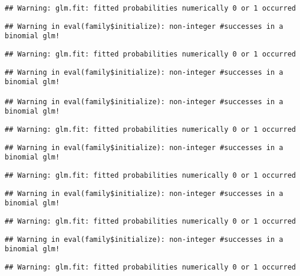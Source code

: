 \documentclass[
]{article}
\begin{document}
\begin{verbatim}
## Warning: glm.fit: fitted probabilities numerically 0 or 1 occurred
\end{verbatim}

\begin{verbatim}
## Warning in eval(family$initialize): non-integer #successes in a binomial glm!
\end{verbatim}

\begin{verbatim}
## Warning: glm.fit: fitted probabilities numerically 0 or 1 occurred
\end{verbatim}

\begin{verbatim}
## Warning in eval(family$initialize): non-integer #successes in a binomial glm!

## Warning in eval(family$initialize): non-integer #successes in a binomial glm!
\end{verbatim}

\begin{verbatim}
## Warning: glm.fit: fitted probabilities numerically 0 or 1 occurred
\end{verbatim}

\begin{verbatim}
## Warning in eval(family$initialize): non-integer #successes in a binomial glm!
\end{verbatim}

\begin{verbatim}
## Warning: glm.fit: fitted probabilities numerically 0 or 1 occurred
\end{verbatim}

\begin{verbatim}
## Warning in eval(family$initialize): non-integer #successes in a binomial glm!
\end{verbatim}

\begin{verbatim}
## Warning: glm.fit: fitted probabilities numerically 0 or 1 occurred
\end{verbatim}

\begin{verbatim}
## Warning in eval(family$initialize): non-integer #successes in a binomial glm!
\end{verbatim}

\begin{verbatim}
## Warning: glm.fit: fitted probabilities numerically 0 or 1 occurred
\end{verbatim}
\end{document}
